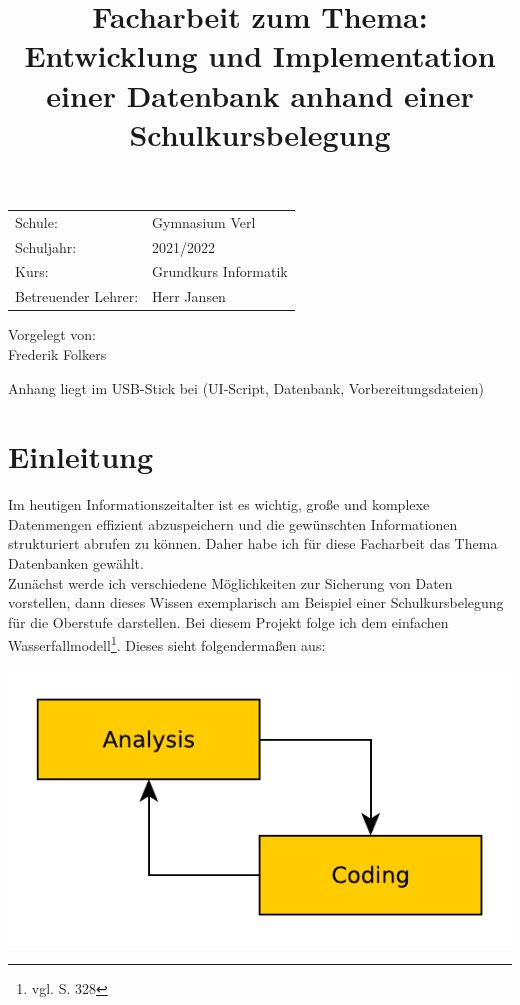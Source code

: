 \documentclass[a4paper, 12pt]{article}
\title{\small Facharbeit zum Thema: \\ \Large Entwicklung und Implementation einer Datenbank anhand einer Schulkursbelegung}
\date{

}
\theoremstyle{plain}
\theoremstyle{definition}
\begin{document}
	\maketitle
	\thispagestyle{empty}
	
	\begin{center}
	\vspace{3cm}
	\begin{tabular}{ll}
	Schule: & Gymnasium Verl \\
	Schuljahr: & 2021/2022\\
	Kurs: & Grundkurs Informatik\\
	Betreuender Lehrer: & Herr Jansen\\
	\end{tabular} 
	\vfill
	Vorgelegt von:\\
	Frederik Folkers
	\end{center}
	\newpage
	\thispagestyle{empty}
	\tableofcontents	
	\vspace{1cm}
	\begin{center}
	Anhang liegt im USB-Stick bei (UI-Script, Datenbank, Vorbereitungsdateien)
	\end{center}
	\newpage	
	
	\onehalfspace
	\section{Einleitung}
	\label{sec:intro}
	Im heutigen Informationszeitalter ist es wichtig, große und komplexe Datenmengen effizient abzuspeichern und die gewünschten Informationen strukturiert abrufen zu können. Daher habe ich für diese Facharbeit das Thema Datenbanken gewählt. \\
	Zunächst werde ich verschiedene Möglichkeiten zur Sicherung von Daten vorstellen, dann dieses Wissen exemplarisch am Beispiel einer Schulkursbelegung für die Oberstufe darstellen. Bei diesem Projekt folge ich dem einfachen Wasserfallmodell\footnote{vgl. \cite{projModell} S. 328}. Dieses sieht folgendermaßen aus:\\
	\begin{center}
	\includegraphics[scale=0.7]{projModell.pdf}
	\end{center}	
	
\end{document}
